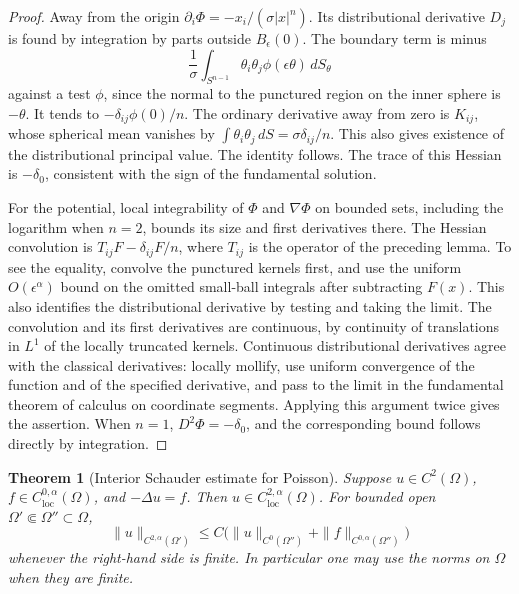 \documentclass[11pt,oneside,openany]{book}
\theoremstyle{plain}
\newtheorem{theorem}{Theorem}[chapter]
\theoremstyle{definition}
\theoremstyle{remark}
\begin{document}
\begin{proof}
Away from the origin \(\partial_i\Phi=-x_i/(\sigma|x|^n)\).
Its distributional derivative \(D_j\) is found by integration by
parts outside \(B_\epsilon(0)\). The boundary term is minus
\[
 \frac1{\sigma}\int_{S^{n-1}}\theta_i\theta_j
                                      \phi(\epsilon\theta)\,dS_\theta
\]
against a test \(\phi\), since the normal to the punctured region
on the inner sphere is \(-\theta\).
It tends to \(-\delta_{ij}\phi(0)/n\). The ordinary derivative
away from zero is \(K_{ij}\), whose spherical mean vanishes
by \(\int\theta_i\theta_j\,dS=\sigma\delta_{ij}/n\).
This also gives existence of the distributional principal value.
The identity follows. The trace of this Hessian is \(-\delta_0\),
consistent with the sign of the fundamental solution.

For the potential, local integrability of \(\Phi\) and \(\nabla\Phi\)
on bounded sets, including the logarithm when \(n=2\), bounds its
size and first derivatives there. The Hessian convolution is
\(T_{ij}F-\delta_{ij}F/n\), where \(T_{ij}\) is the operator of
the preceding lemma. To see the equality, convolve the punctured
kernels first, and use the uniform \(O(\epsilon^\alpha)\) bound
on the omitted small-ball integrals after subtracting \(F(x)\).
This also identifies the distributional derivative by testing
and taking the limit. The convolution and its first derivatives
are continuous, by continuity of translations in \(L^1\) of
the locally truncated kernels. Continuous distributional
derivatives agree with the classical derivatives: locally mollify,
use uniform convergence of the function and of the specified
derivative, and pass to the limit in the fundamental theorem of
calculus on coordinate segments. Applying this argument twice
gives the assertion. When \(n=1\), \(D^2\Phi=-\delta_0\),
and the corresponding bound follows directly by integration.
\end{proof}

\begin{theorem}[Interior Schauder estimate for Poisson]\label{pde:elliptic-poisson-schauder}
Suppose \(u\in C^2(\Omega)\), \(f\in C^{0,\alpha}_{\mathrm{loc}}(\Omega)\),
and \(-\Delta u=f\). Then \(u\in C^{2,\alpha}_{\mathrm{loc}}(\Omega)\).
For bounded open \(\Omega'\Subset\Omega''\subset\Omega\),
\[
 \|u\|_{C^{2,\alpha}(\Omega')}
   \leq C\bigl(\|u\|_{C^0(\Omega'')}+
                      \|f\|_{C^{0,\alpha}(\Omega'')}\bigr)
\]
whenever the right-hand side is finite. In particular one may use
the norms on \(\Omega\) when they are finite.
\end{theorem}
\end{document}
